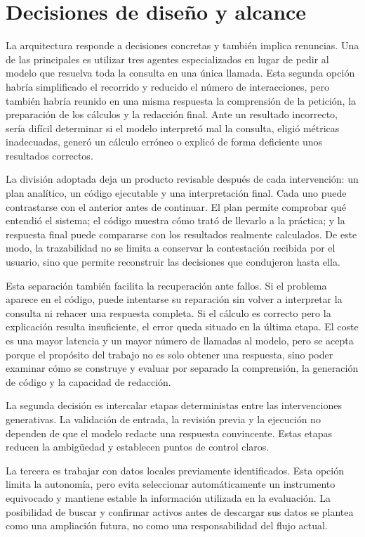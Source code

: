 \section{Decisiones de diseño y alcance}

La arquitectura responde a decisiones concretas y también implica renuncias. Una de las principales es utilizar tres agentes especializados en lugar de pedir al modelo que resuelva toda la consulta en una única llamada. Esta segunda opción habría simplificado el recorrido y reducido el número de interacciones, pero también habría reunido en una misma respuesta la comprensión de la petición, la preparación de los cálculos y la redacción final. Ante un resultado incorrecto, sería difícil determinar si el modelo interpretó mal la consulta, eligió métricas inadecuadas, generó un cálculo erróneo o explicó de forma deficiente unos resultados correctos.

La división adoptada deja un producto revisable después de cada intervención: un plan analítico, un código ejecutable y una interpretación final. Cada uno puede contrastarse con el anterior antes de continuar. El plan permite comprobar qué entendió el sistema; el código muestra cómo trató de llevarlo a la práctica; y la respuesta final puede compararse con los resultados realmente calculados. De este modo, la trazabilidad no se limita a conservar la contestación recibida por el usuario, sino que permite reconstruir las decisiones que condujeron hasta ella.

Esta separación también facilita la recuperación ante fallos. Si el problema aparece en el código, puede intentarse su reparación sin volver a interpretar la consulta ni rehacer una respuesta completa. Si el cálculo es correcto pero la explicación resulta insuficiente, el error queda situado en la última etapa. El coste es una mayor latencia y un mayor número de llamadas al modelo, pero se acepta porque el propósito del trabajo no es solo obtener una respuesta, sino poder examinar cómo se construye y evaluar por separado la comprensión, la generación de código y la capacidad de redacción.

La segunda decisión es intercalar etapas deterministas entre las intervenciones generativas. La validación de entrada, la revisión previa y la ejecución no dependen de que el modelo redacte una respuesta convincente. Estas etapas reducen la ambigüedad y establecen puntos de control claros.

La tercera es trabajar con datos locales previamente identificados. Esta opción limita la autonomía, pero evita seleccionar automáticamente un instrumento equivocado y mantiene estable la información utilizada en la evaluación. La posibilidad de buscar y confirmar activos antes de descargar sus datos se plantea como una ampliación futura, no como una responsabilidad del flujo actual.

